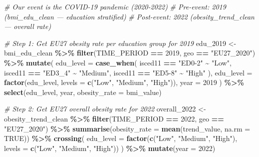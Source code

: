 \documentclass[
]{article}
\newenvironment{Shaded}{\begin{snugshade}}{\end{snugshade}}
\newcommand{\AttributeTok}[1]{\textcolor[rgb]{0.13,0.29,0.53}{#1}}
\newcommand{\CommentTok}[1]{\textcolor[rgb]{0.56,0.35,0.01}{\textit{#1}}}
\newcommand{\ConstantTok}[1]{\textcolor[rgb]{0.56,0.35,0.01}{#1}}
\newcommand{\DecValTok}[1]{\textcolor[rgb]{0.00,0.00,0.81}{#1}}
\newcommand{\FunctionTok}[1]{\textcolor[rgb]{0.13,0.29,0.53}{\textbf{#1}}}
\newcommand{\NormalTok}[1]{#1}
\newcommand{\OtherTok}[1]{\textcolor[rgb]{0.56,0.35,0.01}{#1}}
\newcommand{\SpecialCharTok}[1]{\textcolor[rgb]{0.81,0.36,0.00}{\textbf{#1}}}
\newcommand{\StringTok}[1]{\textcolor[rgb]{0.31,0.60,0.02}{#1}}
\begin{document}
\begin{Shaded}
\begin{Highlighting}[]

\CommentTok{\# Our event is the COVID{-}19 pandemic (2020{-}2022)}
\CommentTok{\# Pre{-}event: 2019 (bmi\_edu\_clean — education stratified)}
\CommentTok{\# Post{-}event: 2022 (obesity\_trend\_clean — overall rate)}

\CommentTok{\# Step 1: Get EU27 obesity rate per education group for 2019}
\NormalTok{edu\_2019 }\OtherTok{\textless{}{-}}\NormalTok{ bmi\_edu\_clean }\SpecialCharTok{\%\textgreater{}\%}
  \FunctionTok{filter}\NormalTok{(TIME\_PERIOD }\SpecialCharTok{==} \DecValTok{2019}\NormalTok{, geo }\SpecialCharTok{==} \StringTok{"EU27\_2020"}\NormalTok{) }\SpecialCharTok{\%\textgreater{}\%}
  \FunctionTok{mutate}\NormalTok{(}
    \AttributeTok{edu\_level =} \FunctionTok{case\_when}\NormalTok{(}
\NormalTok{      isced11 }\SpecialCharTok{==} \StringTok{"ED0{-}2"} \SpecialCharTok{\textasciitilde{}} \StringTok{"Low"}\NormalTok{,}
\NormalTok{      isced11 }\SpecialCharTok{==} \StringTok{"ED3\_4"} \SpecialCharTok{\textasciitilde{}} \StringTok{"Medium"}\NormalTok{,}
\NormalTok{      isced11 }\SpecialCharTok{==} \StringTok{"ED5{-}8"} \SpecialCharTok{\textasciitilde{}} \StringTok{"High"}
\NormalTok{    ),}
    \AttributeTok{edu\_level =} \FunctionTok{factor}\NormalTok{(edu\_level, }\AttributeTok{levels =} \FunctionTok{c}\NormalTok{(}\StringTok{"Low"}\NormalTok{, }\StringTok{"Medium"}\NormalTok{, }\StringTok{"High"}\NormalTok{)),}
    \AttributeTok{year =} \DecValTok{2019}
\NormalTok{  ) }\SpecialCharTok{\%\textgreater{}\%}
  \FunctionTok{select}\NormalTok{(edu\_level, year, }\AttributeTok{obesity\_rate =}\NormalTok{ bmi\_value)}

\CommentTok{\# Step 2: Get EU27 overall obesity rate for 2022}
\NormalTok{overall\_2022 }\OtherTok{\textless{}{-}}\NormalTok{ obesity\_trend\_clean }\SpecialCharTok{\%\textgreater{}\%}
  \FunctionTok{filter}\NormalTok{(TIME\_PERIOD }\SpecialCharTok{==} \DecValTok{2022}\NormalTok{, geo }\SpecialCharTok{==} \StringTok{"EU27\_2020"}\NormalTok{) }\SpecialCharTok{\%\textgreater{}\%}
  \FunctionTok{summarise}\NormalTok{(}\AttributeTok{obesity\_rate =} \FunctionTok{mean}\NormalTok{(trend\_value, }\AttributeTok{na.rm =} \ConstantTok{TRUE}\NormalTok{)) }\SpecialCharTok{\%\textgreater{}\%}
  \FunctionTok{crossing}\NormalTok{(}
    \AttributeTok{edu\_level =} \FunctionTok{factor}\NormalTok{(}\FunctionTok{c}\NormalTok{(}\StringTok{"Low"}\NormalTok{, }\StringTok{"Medium"}\NormalTok{, }\StringTok{"High"}\NormalTok{), }\AttributeTok{levels =} \FunctionTok{c}\NormalTok{(}\StringTok{"Low"}\NormalTok{, }\StringTok{"Medium"}\NormalTok{, }\StringTok{"High"}\NormalTok{))}
\NormalTok{  ) }\SpecialCharTok{\%\textgreater{}\%}
  \FunctionTok{mutate}\NormalTok{(}\AttributeTok{year =} \DecValTok{2022}\NormalTok{)}


\end{Highlighting}
\end{Shaded}
\end{document}
